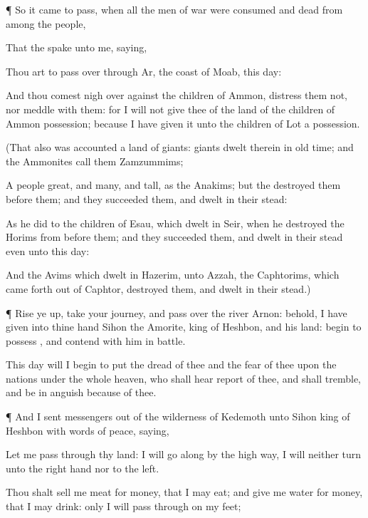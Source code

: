 {\par }{\PP {}¶ So it came to pass, when all the
men of
war were
consumed and
dead from
among the
people,

That the
{}
spake unto me,
saying,

Thou art to pass
over through
Ar, the
coast of
Moab, this
day:

And
{} thou comest
nigh over
against the
children of
Ammon,
distress them not, nor
meddle with them: for I will not
give thee of the
land of the
children of
Ammon
{}
possession; because I have
given it unto the
children of
Lot
{} a
possession.

(That also was
accounted a
land of
giants:
giants
dwelt therein in old
time; and the
Ammonites
call them
Zamzummims;

A
people
great, and
many, and
tall, as the
Anakims; but the
{}
destroyed them
before them; and they
succeeded them, and
dwelt in their stead:

As he
did to the
children of
Esau, which
dwelt in
Seir, when he
destroyed the
Horims from
before them; and they
succeeded them, and
dwelt in their stead even unto this
day:

And the
Avims which
dwelt in
Hazerim,
{} unto
Azzah, the
Caphtorims, which came
forth out of
Caphtor,
destroyed them, and
dwelt in their stead.)


\par }{\PP {}¶ Rise ye
up, take your
journey, and pass
over the
river
Arnon:
behold, I have
given into thine
hand
Sihon the
Amorite,
king of
Heshbon, and his
land:
begin to
possess
{}, and
contend with him in
battle.

This
day will I
begin to
put the
dread of thee and the
fear of thee upon the
nations
{} under the whole
heaven, who shall
hear
report of thee, and shall
tremble, and be in
anguish because of
thee.


\par }{\PP {}¶ And I
sent
messengers out of the
wilderness of
Kedemoth unto
Sihon
king of
Heshbon with
words of
peace,
saying,

Let me
pass through thy
land: I will
go along by the high
way, I will neither
turn unto the right
hand nor to the
left.

Thou shalt
sell me
meat for
money, that I may
eat; and
give me
water for
money, that I may
drink: only I will pass
through on my
feet;

}
